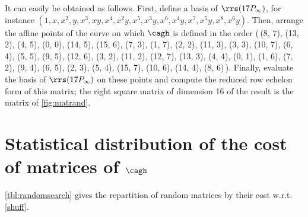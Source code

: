 It can easily be obtained as follows. First, define a basis of $\rrs(17P_\infty)$, for instance
$(1, x, x^2, y, x^3, xy, x^4, x^2 y, x^5, x^3 y, x^6, x^4 y, x^7, x^5 y, x^8, x^6 y)$. Then, arrange the
affine points of the curve on which $\cagh$ is defined in the order
(\,(8, 7), (13, 2), (4, 5), (0, 0), (14, 5), (15, 6), (7, 3), (1, 7), (2, 2), (11, 3), (3, 3), (10, 7), (6, 4),
(5, 5), (9, 5), (12, 6), (3, 2), (11, 2), (12, 7), (13, 3), (4, 4), (0, 1), (1, 6), (7, 2), (9, 4), (6, 5), (2, 3),
(5, 4), (15, 7), (10, 6), (14, 4), (8, 6)\,). Finally, evaluate the basis of $\rrs(17P_\infty)$ on these
points and compute the reduced row echelon form of this matrix;
the right square matrix of dimension 16 of the result is the matrix of \autoref{fig:matrand}.

\FloatBarrier

\section{Statistical distribution of the cost of matrices of $\cagh$}
\label{app:stats}

\autoref{tbl:randomsearch} gives the repartition of random matrices by their cost w.r.t. \autoref{shuff}.

